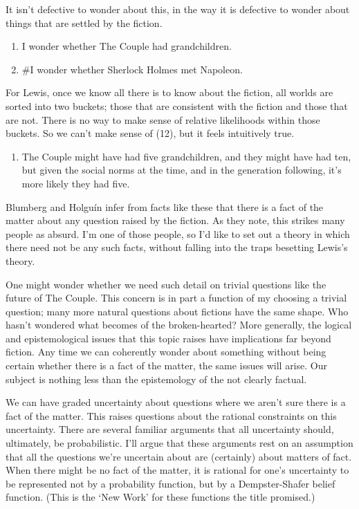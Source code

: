 \documentclass[
  11pt,
  letterpaper,
  DIV=11,
  numbers=noendperiod,
  twoside]{scrartcl}
\providecommand{\tightlist}{%
  \setlength{\itemsep}{0pt}\setlength{\parskip}{0pt}}
\begin{document}
It isn't defective to wonder about this, in the way it is defective to
wonder about things that are settled by the fiction.

\begin{enumerate}
\def\labelenumi{(\arabic{enumi})}
\setcounter{enumi}{9}
\tightlist
\item
  I wonder whether The Couple had grandchildren.
\item
  \#I wonder whether Sherlock Holmes met Napoleon.
\end{enumerate}

For Lewis, once we know all there is to know about the fiction, all
worlds are sorted into two buckets; those that are consistent with the
fiction and those that are not. There is no way to make sense of
relative likelihoods within those buckets. So we can't make sense of
(12), but it feels intuitively true.

\begin{enumerate}
\def\labelenumi{(\arabic{enumi})}
\setcounter{enumi}{11}
\tightlist
\item
  The Couple might have had five grandchildren, and they might have had
  ten, but given the social norms at the time, and in the generation
  following, it's more likely they had five.
\end{enumerate}

Blumberg and Holguín infer from facts like these that there is a fact of
the matter about any question raised by the fiction. As they note, this
strikes many people as absurd. I'm one of those people, so I'd like to
set out a theory in which there need not be any such facts, without
falling into the traps besetting Lewis's theory.

One might wonder whether we need such detail on trivial questions like
the future of The Couple. This concern is in part a function of my
choosing a trivial question; many more natural questions about fictions
have the same shape. Who hasn't wondered what becomes of the
broken-hearted? More generally, the logical and epistemological issues
that this topic raises have implications far beyond fiction. Any time we
can coherently wonder about something without being certain whether
there is a fact of the matter, the same issues will arise. Our subject
is nothing less than the epistemology of the not clearly factual.

We can have graded uncertainty about questions where we aren't sure
there is a fact of the matter. This raises questions about the rational
constraints on this uncertainty. There are several familiar arguments
that all uncertainty should, ultimately, be probabilistic. I'll argue
that these arguments rest on an assumption that all the questions we're
uncertain about are (certainly) about matters of fact. When there might
be no fact of the matter, it is rational for one's uncertainty to be
represented not by a probability function, but by a Dempster-Shafer
belief function. (This is the `New Work' for these functions the title
promised.)
\end{document}

